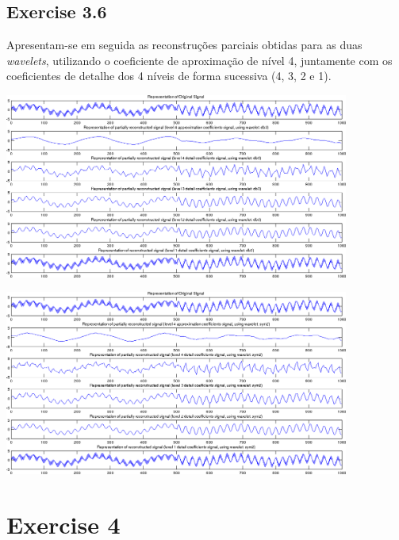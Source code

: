 \documentclass[a4paper]{article}
\begin{document}
\subsection{Exercise 3.6}
\indent \indent Apresentam-se em seguida as reconstruções parciais obtidas para as duas \emph{wavelets}, utilizando o coeficiente de aproximação de nível 4, juntamente com os coeficientes de detalhe dos 4 níveis de forma sucessiva (4, 3, 2 e 1).

\begin{center}
	\includegraphics[width=0.85\textwidth]{images/ex_3_6_db3_rec.png}
\end{center}

\begin{center}
	\includegraphics[width=0.85\textwidth]{images/ex_3_6_sym2_rec.png}
\end{center}

\clearpage

\section{Exercise 4}
\end{document}
